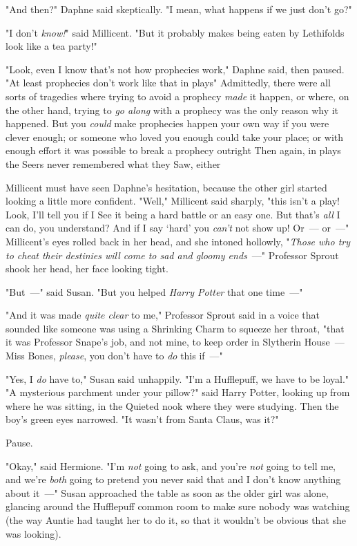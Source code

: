 "And then?" Daphne said skeptically. "I mean, what happens if we just don't go?"

"I don't \emph{know!}" said Millicent. "But it probably makes being eaten by
Lethifolds look like a tea party!"

"Look, even I know that's not how prophecies work," Daphne said, then paused.
"At least prophecies don't work like that in plays{\el}" Admittedly, there
were all sorts of tragedies where trying to avoid a prophecy \emph{made} it
happen, or where, on the other hand, trying to \emph{go along} with a prophecy
was the only reason why it happened. But you \emph{could} make prophecies
happen your own way if you were clever enough; or someone who loved you enough
could take your place; or with enough effort it was possible to break a
prophecy outright{\el} Then again, in plays the Seers never remembered what
they Saw, either{\el}

Millicent must have seen Daphne's hesitation, because the other girl started
looking a little more confident. "Well," Millicent said sharply, "this isn't a
play! Look, I'll tell you if I See it being a hard battle or an easy one. But
that's \emph{all} I can do, you understand? And if I say `hard' you
\emph{can't} not show up! Or~--- or~---" Millicent's eyes rolled back in her head,
and she intoned hollowly, "\emph{Those who try to cheat their destinies will
come to sad and gloomy ends}~---"
\sbreak
Professor Sprout shook her head, her face looking tight.

"But~---" said Susan. "But you helped \emph{Harry Potter} that one time~---"

"And it was made \emph{quite clear} to me," Professor Sprout said in a voice
that sounded like someone was using a Shrinking Charm to squeeze her throat,
"that it was Professor Snape's job, and not mine, to keep order in Slytherin
House~--- Miss Bones, \emph{please}, you don't have to \emph{do} this if~---"

"Yes, I \emph{do} have to," Susan said unhappily. "I'm a Hufflepuff, we have to
be loyal."
\sbreak
"A mysterious parchment under your pillow?" said Harry Potter, looking up from
where he was sitting, in the Quieted nook where they were studying. Then the
boy's green eyes narrowed. "It wasn't from Santa Claus, was it?"

Pause.

"Okay," said Hermione. "I'm \emph{not} going to ask, and you're \emph{not}
going to tell me, and we're \emph{both} going to pretend you never said that
and I don't know anything about it~---"
\sbreak
Susan approached the table as soon as the older girl was alone, glancing around
the Hufflepuff common room to make sure nobody was watching (the way Auntie had
taught her to do it, so that it wouldn't be obvious that she was looking).

